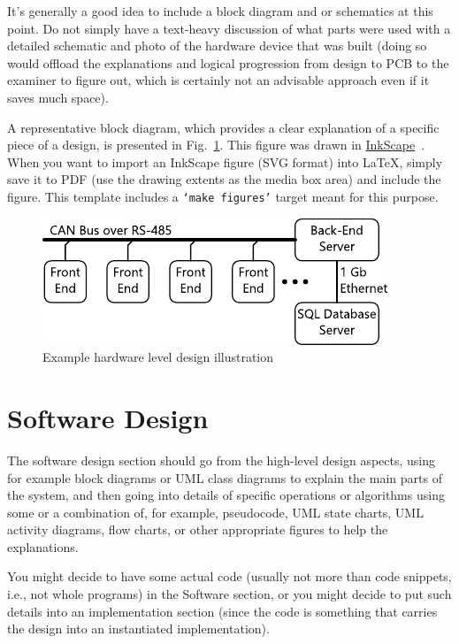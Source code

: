It's generally a good idea to include a block diagram and or schematics at this point.  Do not simply have a text-heavy discussion of what parts were used with a detailed schematic and photo of the hardware device that was built (doing so would offload the explanations and logical progression from design to PCB to the examiner to figure out, which is certainly not an advisable approach even if it saves much space).

A representative block diagram, which provides a clear explanation of a specific piece of a design, is presented in Fig.~\ref{fig:POS_Network}.  This figure was drawn in \href{http://www.inkscape.org/}{InkScape}~\cite{InkScape}. When you want to import an InkScape figure (SVG format) into \LaTeX{}, simply save it to PDF (use the drawing extents as the media box area) and include the figure.  This template includes a \texttt{`make figures'} target meant for this purpose.

\begin{figure}[ht]
\centering
\includegraphics[scale=1.2]{3_Chapters/4_Chapter_Design/Figures/POS_Network.pdf}
\caption{Example hardware level design illustration}
\label{fig:POS_Network}
\end{figure}

\section{Software Design}

The software design section should go from the high-level design aspects, using for example block diagrams or UML class diagrams to explain the main parts of the system, and then going into details of specific operations or algorithms using some or a combination of, for example, pseudocode, UML state charts, UML activity diagrams, flow charts, or other appropriate figures to help the explanations.

You might decide to have some actual code (usually not more than code snippets, i.e., not whole programs) in the Software section, or you might decide to put such details into an implementation section (since the code is something that carries the design into an instantiated implementation).

